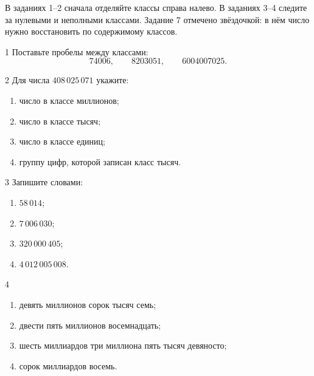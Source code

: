 
\studentline

\begin{routebox}
  В заданиях 1--2 сначала отделяйте классы справа налево. В заданиях 3--4
  следите за нулевыми и неполными классами. Задание 7 отмечено звёздочкой:
  в нём число нужно восстановить по содержимому классов.
\end{routebox}

\begin{homeworktask}{1}
  Поставьте пробелы между классами:
  \[
    74006,\qquad 8203051,\qquad 6004007025.
  \]
  \answerspace{22mm}
\end{homeworktask}

\begin{homeworktask}{2}
  Для числа \(408\,025\,071\) укажите:
  \begin{enumerate}
    \item число в классе миллионов;
    \item число в классе тысяч;
    \item число в классе единиц;
    \item группу цифр, которой записан класс тысяч.
  \end{enumerate}
  \answerspace{28mm}
\end{homeworktask}

\begin{homeworktask}{3}
  Запишите словами:
  \begin{enumerate}
    \item \(58\,014\);
    \item \(7\,006\,030\);
    \item \(320\,000\,405\);
    \item \(4\,012\,005\,008\).
  \end{enumerate}
  \answerspace{44mm}
\end{homeworktask}

\begin{homeworktask}{4}
  \begin{enumerate}
    \item девять миллионов сорок тысяч семь;
    \item двести пять миллионов восемнадцать;
    \item шесть миллиардов три миллиона пять тысяч девяносто;
    \item сорок миллиардов восемь.
  \end{enumerate}
  \answerspace{36mm}
\end{homeworktask}

